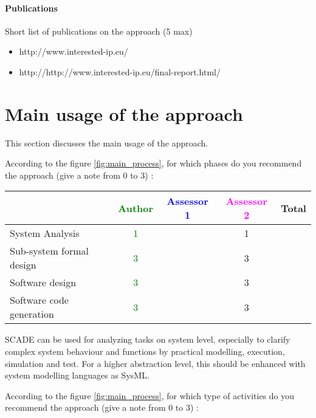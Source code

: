 \paragraph{Publications} Short list of publications on the approach (5 max)

\begin{itemize}
	\item http://www.interested-ip.eu/
  \item http://http://www.interested-ip.eu/final-report.html/

\end{itemize}

\section{Main usage of the approach}
\label{main_usage}
This section discusses the main usage of the approach.

According to the figure \ref{fig:main_process}, for which phases do you recommend the approach (give a note from 0 to  3) :

\begin{tabular}{|l | c | c | c | c|}
\hline
& \textcolor{green}{Author} & \textcolor{blue}{Assessor 1} & \textcolor{magenta}{Assessor 2} & Total \\
\hline 
System Analysis & \textcolor{green}{1}  & &1 &  \\
\hline
Sub-system  formal  design &  \textcolor{green}{3} & &3 & \\
\hline
Software design & \textcolor{green}{3}  & &3 & \\
\hline
Software code generation & \textcolor{green}{3} & &3 & \\
\hline
\end{tabular}

\begin{author_comment}
SCADE can be used for analyzing tasks on system level, especially to clarify complex system behaviour and functions by practical modelling, execution, simulation and test. For a higher abstraction level, this should be enhanced with system modelling languages as SysML.
\end{author_comment}
According to the figure \ref{fig:main_process}, for which type of activities do you recommend the approach (give a note from 0 to  3) :


